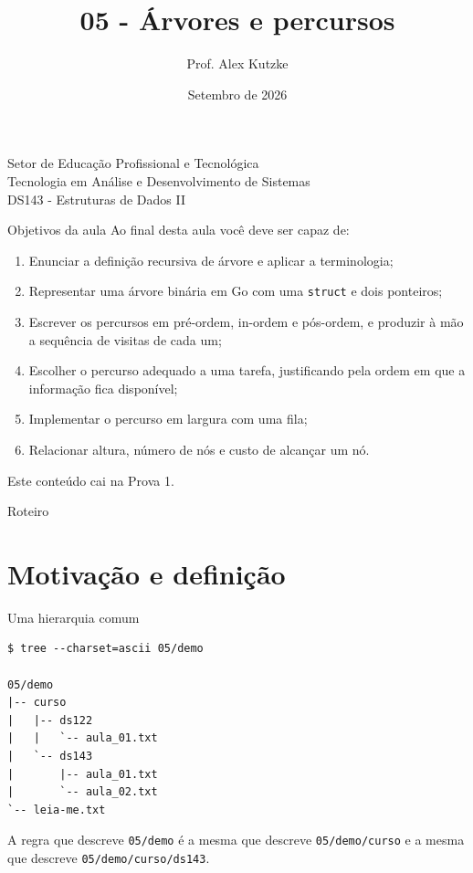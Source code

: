 \documentclass{beamer}
\title{05 - Árvores e percursos}
\author{Prof. Alex Kutzke}
\date{Setembro de 2026}
\begin{document}
\begin{frame}
  \begin{center}
    \large{Setor de Educação Profissional e Tecnológica}\\
    Tecnologia em Análise e Desenvolvimento de Sistemas\\
    \vspace{1cm}
    \small{DS143 - Estruturas de Dados II}
  \end{center}
  \titlepage
\end{frame}

\begin{frame}{Objetivos da aula}
  Ao final desta aula você deve ser capaz de:
  \begin{enumerate}
    \item Enunciar a definição recursiva de árvore e aplicar a terminologia;
    \item Representar uma árvore binária em Go com uma \texttt{struct} e dois
          ponteiros;
    \item Escrever os percursos em pré-ordem, in-ordem e pós-ordem, e produzir à
          mão a sequência de visitas de cada um;
    \item Escolher o percurso adequado a uma tarefa, justificando pela ordem em
          que a informação fica disponível;
    \item Implementar o percurso em largura com uma fila;
    \item Relacionar altura, número de nós e custo de alcançar um nó.
  \end{enumerate}

  \vspace{0.3cm}
  \footnotesize Este conteúdo cai na Prova 1.
\end{frame}

\begin{frame}{Roteiro}
  \tableofcontents
\end{frame}

\section{Motivação e definição}

\begin{frame}[fragile]{Uma hierarquia comum}
  \begin{verbatim}
$ tree --charset=ascii 05/demo

05/demo
|-- curso
|   |-- ds122
|   |   `-- aula_01.txt
|   `-- ds143
|       |-- aula_01.txt
|       `-- aula_02.txt
`-- leia-me.txt
  \end{verbatim}

  \vspace{0.2cm}
  A regra que descreve \texttt{05/demo} é a mesma que descreve
  \texttt{05/demo/curso} e a mesma que descreve
  \texttt{05/demo/curso/ds143}.
\end{frame}
\end{document}
